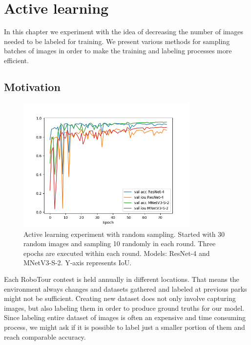 \chapter{Active learning}
\label{chapter:activelearning}

In this chapter we experiment with the idea of decreasing the number of images needed to
be labeled for training. We present various methods for sampling batches of images in order
to make the training and labeling processes more efficient.

\section{Motivation}
\label{sec:almotivation}

\begin{figure}[!h]
	\centerline{\includegraphics[width=0.8\textwidth]{images/al_random_demonstration.png}}
	\caption[Active learning experiment with random sampling]{Active learning experiment with random sampling. Started with 30 random images and sampling 10 randomly in each round. Three epochs
	are executed within each round. Models: ResNet-4 and MNetV3-S-2. Y-axis represents IoU.}
	\label{img:al_random_initial}
\end{figure}

Each RoboTour contest is held annually in different locations. That means the environment always
changes and datasets gathered and labeled at previous parks might not be sufficient. Creating
new dataset does not only involve capturing images, but also labeling them in order to
produce ground truths for our model. Since labeling entire dataset of images is often an expensive
and time consuming process, we might ask if it is possible to label just a smaller portion of them
and reach comparable accuracy.


